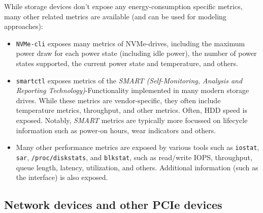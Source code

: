 While storage devices don't expose any energy-consumption specific metrics, many other related metrics are available (and can be used for modeling approaches):
\begin{itemize}
    \item \texttt{NVMe-cli}\parencite{nvmecli_github} exposes many metrics of NVMe-drives, including the maximum power draw for each power state (including idle power), the number of power states supported, the current power state and temperature, and others.
    \item \texttt{smartctl}\parencite{smartmontools_github} exposes metrics of the \textit{SMART (Self-Monitoring, Analysis and Reporting Technology)}-Functionality implemented in many modern storage drives. While these metrics are vendor-specific, they often include temperature metrics, throughput, and other metrics. Often, HDD speed is exposed. Notably, \textit{SMART} metrics are typically more focussed on lifecycle information such as power-on hours, wear indicators and others.
    \item Many other performance metrics are exposed by various tools such as \texttt{iostat}, \texttt{sar}, \texttt{/proc/diskstats}, and \texttt{blkstat}, such as read/write IOPS, throughput, queue length, latency, utilization, and others. Additional information (such as the interface) is also exposed.
\end{itemize}

\subsection{Network devices and other PCIe devices}


